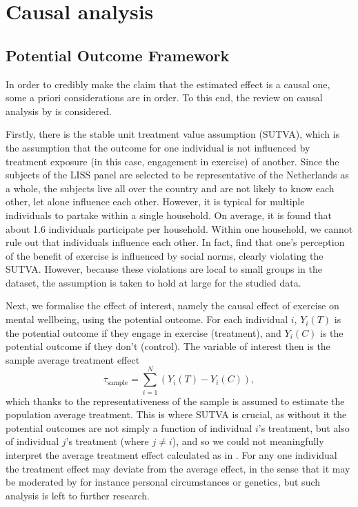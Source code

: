 \section{Causal analysis}
\label{sec:methods:causal}

\subsection{Potential Outcome Framework}
In order to credibly make the claim that the estimated effect is a causal one, some a priori considerations are in order.
To this end, the review on causal analysis by  is considered.

Firstly, there is the stable unit treatment value assumption (SUTVA), which is the assumption that the outcome for one
individual is not influenced by treatment exposure (in this case, engagement in exercise) of another.
Since the subjects of the LISS panel are selected to be representative of the Netherlands as a whole, the subjects
live all over the country and are not likely to know each other, let alone influence each other. However, it is typical
for multiple individuals to partake within a single household. On average, it is found that about 1.6 individuals participate
per household. Within one household, we cannot rule out that individuals influence each other. In fact, 
find that one's perception of the benefit of exercise is influenced by social norms, clearly violating the SUTVA.
However, because these violations are local to small groups in the dataset, the assumption is taken to hold at large for
the studied data.

Next, we formalise the effect of interest, namely the causal effect of exercise on mental wellbeing, using the
potential outcome.
For each individual $i$, $Y_i(T)$ is the potential outcome if they engage in exercise (treatment),
and $Y_i(C)$ is the potential outcome if they don't (control). The variable of interest then is the sample average
treatment effect
\begin{equation}
\label{eq:methods:sate}
    \tau_{\text{sample}} = \sum_{i=1}^N (Y_i(T) - Y_i(C)),
\end{equation}
which thanks to the representativeness of the sample is assumed to estimate the population average treatment.
This is where SUTVA is crucial, as without it the potential outcomes are not simply a function of individual $i$'s treatment,
but also of individual $j$'s treatment (where $j \neq i$), and so we could not meaningfully interpret the average
treatment effect calculated as in .
For any one individual the treatment effect may deviate from the average effect, in the sense that it may be moderated by
for instance personal circumstances or genetics, but such analysis is left to further research.

